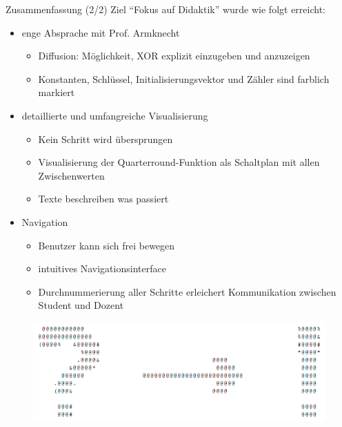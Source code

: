 \documentclass{beamer}
\begin{document}
\begin{frame}{Zusammenfassung (2/2)}
Ziel ``Fokus auf Didaktik'' wurde wie folgt erreicht:
\begin{itemize}
\item enge Absprache mit Prof. Armknecht
\begin{itemize}
\item Diffusion: Möglichkeit, XOR explizit einzugeben und anzuzeigen
\item Konstanten, Schlüssel, Initialisierungsvektor und Zähler sind farblich markiert
\end{itemize}
\item detaillierte und umfangreiche Visualisierung
\begin{itemize}
\item Kein Schritt wird übersprungen
\item Visualisierung der Quarterround-Funktion als Schaltplan mit allen Zwischenwerten
\item Texte beschreiben was passiert
\end{itemize}
\item Navigation
\begin{itemize}
\item Benutzer kann sich frei bewegen
\item intuitives Navigationsinterface
\item Durchnummerierung aller Schritte erleichert Kommunikation zwischen Student und Dozent
\end{itemize}
\end{itemize}
\end{frame}

\begin{frame}
\begin{figure}
\center
\begin{minipage}{0.8\textwidth}
\includegraphics[width=\textwidth]{figures/kolloquium/kolloquium-ascii-art.png}
\end{minipage}
\end{figure}
\end{frame}
\end{document}
